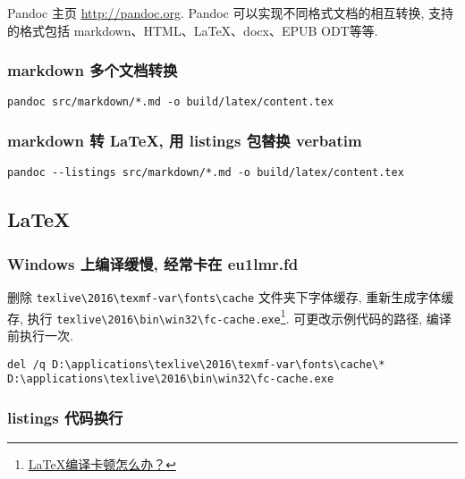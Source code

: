 Pandoc 主页 \url{http://pandoc.org}. Pandoc
可以实现不同格式文档的相互转换, 支持的格式包括
markdown、HTML、LaTeX、docx、EPUB ODT等等.

\subsubsection{markdown
多个文档转换}\label{markdown-ux591aux4e2aux6587ux6863ux8f6cux6362}

\begin{lstlisting}
pandoc src/markdown/*.md -o build/latex/content.tex
\end{lstlisting}

\subsubsection{markdown 转 LaTeX, 用 listings 包替换
verbatim}\label{markdown-ux8f6c-latex-ux7528-listings-ux5305ux66ffux6362-verbatim}

\begin{lstlisting}
pandoc --listings src/markdown/*.md -o build/latex/content.tex
\end{lstlisting}

\subsection{LaTeX}\label{latex}

\subsubsection{Windows 上编译缓慢, 经常卡在
eu1lmr.fd}\label{windows-ux4e0aux7f16ux8bd1ux7f13ux6162-ux7ecfux5e38ux5361ux5728-eu1lmr.fd}

删除 \lstinline!texlive\2016\texmf-var\fonts\cache! 文件夹下字体缓存,
重新生成字体缓存, 执行
\lstinline!texlive\2016\bin\win32\fc-cache.exe!\footnote{\href{https://www.zhihu.com/question/51999238/answer/135852542}{LaTeX编译卡顿怎么办？}}.
可更改示例代码的路径, 编译前执行一次.

\begin{lstlisting}
del /q D:\applications\texlive\2016\texmf-var\fonts\cache\*
D:\applications\texlive\2016\bin\win32\fc-cache.exe
\end{lstlisting}

\subsubsection{listings
代码换行}\label{listings-ux4ee3ux7801ux6362ux884c}

